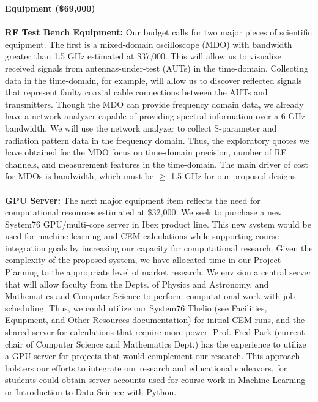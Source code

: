 \documentclass[11pt]{amsart}
\begin{document}
\noindent
\textbf{Equipment (\$69,000)} \\ \\
\noindent
\textbf{RF Test Bench Equipment:} Our budget calls for two major pieces of scientific equipment. The first is a mixed-domain oscilloscope (MDO) with bandwidth greater than 1.5 GHz estimated at \$37,000. This will allow us to visualize received signals from antennas-under-test (AUTs) in the time-domain. Collecting data in the time-domain, for example, will allow us to discover reflected signals that represent faulty coaxial cable connections between the AUTs and transmitters. Though the MDO can provide frequency domain data, we already have a network analyzer capable of providing spectral information over a 6 GHz bandwidth. We will use the network analyzer to collect S-parameter and radiation pattern data in the frequency domain. Thus, the exploratory quotes we have obtained for the MDO focus on time-domain precision, number of RF channels, and measurement features in the time-domain. The main driver of cost for MDOs is bandwidth, which must be $\geq$ 1.5 GHz for our proposed designs. \\ \\
\noindent
\textbf{GPU Server:} The next major equipment item reflects the need for computational resources estimated at \$32,000.  We seek to purchase a new System76 GPU/multi-core server in Ibex product line. This new system would be used for machine learning and CEM calculations while supporting course integration goals by increasing our capacity for computational research. Given the complexity of the proposed system, we have allocated time in our Project Planning to the appropriate level of market research.  We envision a central server that will allow faculty from the Depts. of Physics and Astronomy, and Mathematics and Computer Science to perform computational work with job-scheduling. Thus, we could utilize our System76 Thelio (see Facilities, Equipment, and Other Resources documentation) for initial CEM runs, and the shared server for calculations that require more power. Prof. Fred Park (current chair of Computer Science and Mathematics Dept.) has the experience to utilize a GPU server for projects that would complement our research. This approach bolsters our efforts to integrate our research and educational endeavors, for students could obtain server accounts used for course work in Machine Learning or Introduction to Data Science with Python. \\
\end{document}
